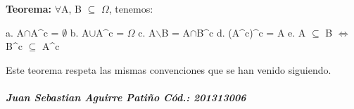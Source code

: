 \documentclass[12pt]{article}
\begin{document}
\textbf{Teorema:} $\forall$A, B $\subseteq$ $\varOmega$, tenemos:
\begin{center}
a. A$\cap$A^c = $\emptyset$
b. A$\cup$A^c = $\varOmega$
c. A$\backslash$B = A$\cap$B^c
d. (A^c)^c = A
e. A $\subseteq$ B $\Leftrightarrow$ B^c $\subseteq$ A^c
\end{center}
Este teorema respeta las mismas convenciones que se han venido siguiendo.\\

\subparagraph{Juan Sebastian Aguirre Patiño Cód.: 201313006}
\end{document}

